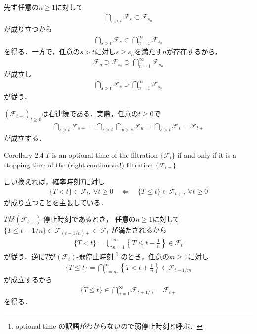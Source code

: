 	\begin{prf}
		先ず任意の$n \geq 1$に対して
		\begin{align}
			\bigcap_{s > t} \mathscr{F}_s \subset \mathscr{F}_{s_n}
		\end{align}
		が成り立つから
		\begin{align}
			\bigcap_{s > t} \mathscr{F}_s \subset \bigcap_{n=1}^\infty \mathscr{F}_{s_n}
		\end{align}
		を得る．一方で，任意の$s > t$に対し$s \geq s_n$を満たす$n$が存在するから，
		\begin{align}
			\mathscr{F}_s \supset  \mathscr{F}_{s_n}
			\supset \bigcap_{n=1}^\infty \mathscr{F}_{s_n}
		\end{align}
		が成立し
		\begin{align}
			\bigcap_{s > t} \mathscr{F}_s \supset \bigcap_{n=1}^\infty \mathscr{F}_{s_n}
		\end{align}
		が従う．
		\QED
	\end{prf}
	
	$(\mathscr{F}_{t+})_{t \geq 0}$は右連続である．実際，任意の$t \geq 0$で
	\begin{align}
		\bigcap_{s > t} \mathscr{F}_{s+} = \bigcap_{s > t} \bigcap_{u > s} \mathscr{F}_u
		= \bigcap_{s > t} \mathscr{F}_s
		= \mathscr{F}_{t+}
	\end{align}
	が成立する．
	
	\begin{itembox}[l]{Corollary 2.4}\label{chapter_1_Corollary_2_4}
		$T$ is an optional time of the filtration $\{\mathscr{F}_t\}$ if and only if 
		it is a stopping time of the (right-continuous!) filtration $\{\mathscr{F}_{t+}\}$.
	\end{itembox}
	言い換えれば，確率時刻$T$に対し
	\begin{align}
		\{T < t\} \in \mathscr{F}_t,\ \forall t \geq 0
		\quad \Leftrightarrow \quad
		\{T \leq t\} \in \mathscr{F}_{t+},\ \forall t \geq 0
	\end{align}
	が成り立つことを主張している．
	\begin{prf}
		$T$が$(\mathscr{F}_{t+})$-停止時刻であるとき，
		任意の$n \geq 1$に対して$\{T \leq t - 1/n\} \in \mathscr{F}_{(t-1/n)+} \subset \mathscr{F}_t$
		が満たされるから
		\begin{align}
			\{T < t\} = \bigcup_{n=1}^\infty \left\{T \leq t - \frac{1}{n}\right\} \in \mathscr{F}_t
		\end{align}
		が従う．逆に$T$が$(\mathscr{F}_t)$-弱停止時刻
		\footnote{
			optional time の訳語がわからないので弱停止時刻と呼ぶ．
		}
		のとき，任意の$m \geq 1$に対し
		\begin{align}
			\{T \leq t\} = \bigcap_{n=m}^\infty \left\{T < t+\frac{1}{n} \right\}
			\in \mathscr{F}_{t + 1/m}
		\end{align}
		が成立するから
		\begin{align}
			\{T \leq t\} \in \bigcap_{n=1}^\infty \mathscr{F}_{t + 1/n} = \mathscr{F}_{t+}
		\end{align}
		を得る．
		\QED
	\end{prf}
	
